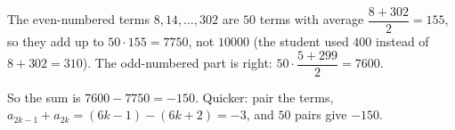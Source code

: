 The even-numbered terms $8,14,\dots,302$ are $50$ terms with average $\dfrac{8+302}{2}=155$, so they add up to $50\cdot155=7750$, not $10000$ (the student used $400$ instead of $8+302=310$). The odd-numbered part is right: $50\cdot\dfrac{5+299}{2}=7600$.

So the sum is $7600-7750=\boxed{-150}$. Quicker: pair the terms, $a_{2k-1}+a_{2k}=(6k-1)-(6k+2)=-3$, and $50$ pairs give $-150$.
